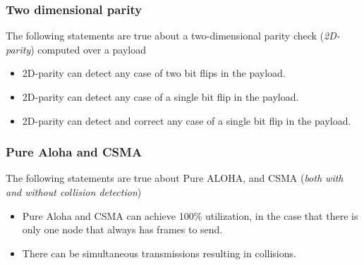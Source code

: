     \subsubsection*{Two dimensional parity}
    \noindent The following statements are true about a two-dimensional parity check (\textit{2D-parity}) computed over a payload
    \begin{itemize}
        \item 2D-parity can detect any case of two bit flips in the payload.
        \item 2D-parity can detect any case of a single bit flip in the payload.
        \item 2D-parity can detect and correct any case of a single bit flip in the payload.
    \end{itemize}

    \subsubsection*{Pure Aloha and CSMA}
    \noindent The following statements are true about Pure ALOHA, and CSMA (\textit{both with and without collision detection})
    \begin{itemize}
        \item Pure Aloha and CSMA can achieve 100\% utilization, in the case that there is only one node that always has frames to send.
        \item There can be simultaneous transmissions resulting in collisions.
    \end{itemize}

